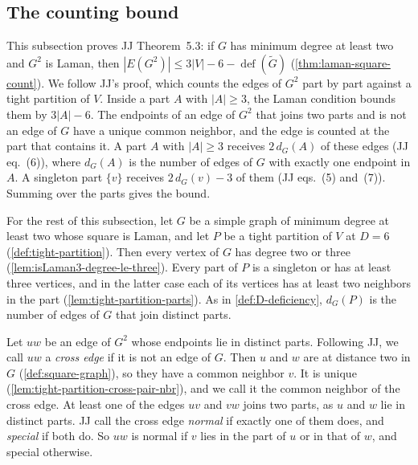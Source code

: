 \subsection{The counting bound}
\label{sec:jacobs-counting}

This subsection proves JJ Theorem~5.3: if $G$ has minimum degree at
least two and $G^2$ is Laman, then
$|E(G^2)| \le 3|V| - 6 - \operatorname{def}(\tilde G)$
(\cref{thm:laman-square-count}). We follow JJ's proof, which counts the
edges of $G^2$ part by part against a tight partition of $V$. Inside a
part $A$ with $|A| \ge 3$, the Laman condition bounds them by
$3|A| - 6$. The endpoints of an edge of $G^2$ that joins two parts and
is not an edge of $G$ have a unique common neighbor, and the edge is
counted at the part that contains it. A part $A$ with $|A| \ge 3$
receives $2\,d_G(A)$ of these edges (JJ eq.~(6)), where $d_G(A)$ is the
number of edges of $G$ with exactly one endpoint in $A$. A singleton
part $\{v\}$ receives $2\,d_G(v) - 3$ of them (JJ eqs.~(5) and~(7)).
Summing over the parts gives the bound.

For the rest of this subsection, let $G$ be a simple graph of minimum
degree at least two whose square is Laman, and let $P$ be a tight
partition of $V$ at $D = 6$ (\cref{def:tight-partition}). Then
every vertex of $G$ has degree two or three
(\cref{lem:isLaman3-degree-le-three}). Every part of $P$ is a singleton
or has at least three vertices, and in the latter case each of its
vertices has at least two neighbors in the part
(\cref{lem:tight-partition-parts}). As in \cref{def:D-deficiency},
$d_G(P)$ is the number of edges of $G$ that join distinct parts.

Let $uw$ be an edge of $G^2$ whose endpoints lie in distinct parts.
Following JJ, we call $uw$ a \emph{cross edge} if it is not an edge of
$G$. Then $u$ and $w$ are at distance two in $G$
(\cref{def:square-graph}), so they have a common neighbor $v$. It is
unique (\cref{lem:tight-partition-cross-pair-nbr}), and we call it the
common neighbor of the cross edge. At least one of the edges $uv$ and
$vw$ joins two parts, as $u$ and $w$ lie in distinct parts. JJ call the
cross edge \emph{normal} if exactly one of them does, and
\emph{special} if both do. So $uw$ is normal if $v$ lies in the part of
$u$ or in that of $w$, and special otherwise.

